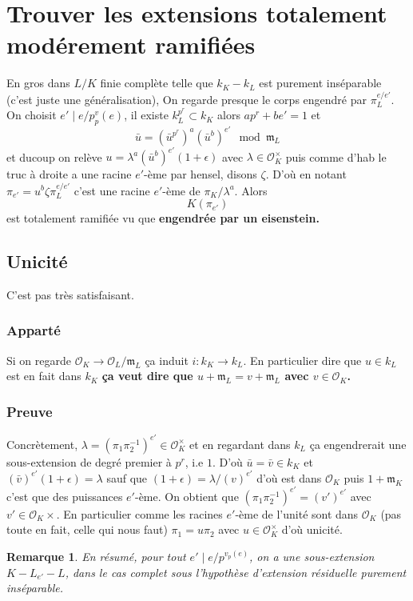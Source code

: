 \documentclass[a4paper,12pt]{book}
\newcommand{\Or}{\mathcal{O}}
\newcommand{\m}{\mathfrak m}
\theoremstyle{plain}
\newtheorem{rem}{Remarque}
\theoremstyle{definition}
\theoremstyle{remark}
\begin{document}
\section{Trouver les extensions totalement modérement ramifiées}
En gros dans $L/K$ finie complète telle que $k_K-k_L$
est purement inséparable (c'est juste une généralisation), 
On regarde presque le corps engendré par $\pi_L^{e/e'}$.
On choisit $e'\mid e/p^v_p(e)$, il existe $k_L^{p^r}\subset k_K$
alors $ap^r+be'=1$ et
\[\bar u=(\bar u^{p^r})^a(\bar u^b)^{e'}\mod \m_L\]
et ducoup on relève $u=\lambda^a(\bar u^b)^{e'}(1+\epsilon)$
avec $\lambda\in \Or_K^\times $ puis comme d'hab le truc à droite
a une racine $e'$-ème par hensel, disons $\zeta$. D'où en notant
$\pi_{e'}=u^b\zeta\pi_L^{e/e'}$ c'est une racine $e'$-ème de 
$\pi_K/\lambda^a$. Alors
\[K(\pi_{e'})\]
est totalement ramifiée vu que 
\textbf{engendrée par un eisenstein.}

\subsection{Unicité}
C'est pas très satisfaisant.
\subsubsection{Apparté}
Si on regarde $\Or_K\to\Or_L/\m_L$ ça induit $i\colon k_K\to k_L$.
En particulier dire que $u\in k_L$ est en fait dans $k_K$ 
\textbf{ça veut dire que $u+\m_L=v+\m_L$ avec $v\in \Or_K$.}
\subsubsection{Preuve}
Concrètement, $\lambda=(\pi_1\pi_2^{-1})^{e'}\in \Or_K^\times$ et
en regardant dans $k_L$ ça engendrerait une sous-extension de 
degré premier à $p^r$, i.e $1$. D'où $\bar u=\bar v\in k_K$ et
$(\bar v)^{e'}(1+\epsilon)=\lambda$ sauf que 
$(1+\epsilon)=\lambda/(v)^{e'}$ d'où est dans $\Or_K$ puis
$1+\m_K$ c'est que des puissances $e'$-ème. On obtient que
$(\pi_1\pi_2^{-1})^{e'}=(v')^{e'}$ avec $v'\in \Or_K\times$.
En particulier comme les racines $e'$-ème de l'unité sont dans
$\Or_K$ (pas toute en fait, celle qui nous faut)
$\pi_1=u\pi_2$ avec $u\in\Or_K^\times$ d'où unicité.

\begin{rem}
    En résumé, pour tout $e'\mid e/p^{v_p(e)}$, on a une 
    sous-extension $K-L_{e'}-L$, dans le cas complet sous
    l'hypothèse d'extension résiduelle purement inséparable.
\end{rem}
\end{document}
